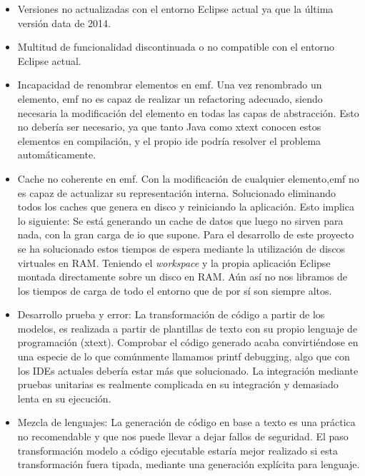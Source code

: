 \begin{itemize}
    

\item Versiones no actualizadas con el entorno Eclipse actual ya que la última versión data de 2014.

\item Multitud de funcionalidad discontinuada o no compatible con el entorno Eclipse actual.

\item Incapacidad de renombrar elementos en \gls{emf}. Una vez renombrado un elemento, \gls{emf} no es capaz de realizar un refactoring adecuado, siendo necesaria la modificación del elemento en todas las capas de abstracción. Esto no debería ser necesario, ya que tanto Java como \gls{xtext} conocen estos elementos en compilación, y el propio \gls{ide} podría resolver el problema automáticamente.

\item Cache no coherente en \gls{emf}. Con la modificación de cualquier elemento,\gls{emf} no es capaz de actualizar su representación interna. Solucionado eliminando todos los caches que genera en disco y reiniciando la aplicación. Esto implica lo siguiente: Se está generando un cache de datos que luego no sirven para nada, con la gran carga de \gls{io} que supone. Para el desarrollo de este proyecto se ha solucionado estos tiempos de espera mediante la utilización de discos virtuales en RAM. Teniendo el \textit{workspace} y la propia aplicación Eclipse montada directamente sobre un disco en RAM. Aún así no nos libramos de los tiempos de carga de todo el entorno que de por sí son siempre altos.


\item Desarrollo prueba y error: La transformación de código a partir de los modelos, es realizada a partir de plantillas de texto con su propio lenguaje de programación (\gls{xtext}). Comprobar el código generado acaba convirtiéndose en una especie de lo que comúnmente llamamos printf debugging, algo que con los IDEs actuales debería estar más que solucionado.
La integración mediante pruebas unitarias es realmente complicada en su integración y demasiado lenta en su ejecución.

\item Mezcla de lenguajes: La generación de código en base a texto es una práctica no recomendable y que nos puede llevar a dejar fallos de seguridad. El paso transformación modelo a código ejecutable estaría mejor realizado si esta transformación fuera tipada, mediante una generación explícita para lenguaje.


\end{itemize}
